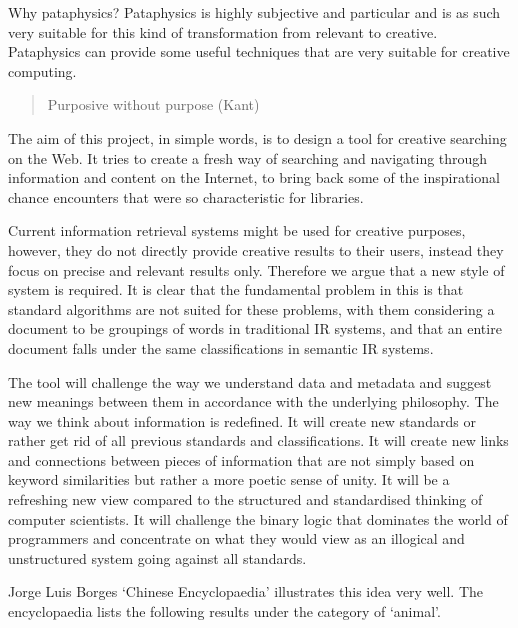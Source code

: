 Why pataphysics?
Pataphysics is highly subjective and particular and is as such very suitable for this kind of transformation from relevant to creative.
Pataphysics can provide some useful techniques that are very suitable for creative computing.

\begin{quote}
  Purposive without purpose (Kant)
\end{quote}

The aim of this project, in simple words, is to design a tool for creative searching on the Web. It tries to create a fresh way of searching and navigating through information and content on the Internet, to bring back some of the inspirational chance encounters that were so characteristic for libraries.

Current information retrieval systems might be used for creative purposes, however, they do not directly provide creative results to their users, instead they focus on precise and relevant results only. Therefore we argue that a new style of system is required. It is clear that the fundamental problem in this is that standard algorithms are not suited for these problems, with them considering a document to be groupings of words in traditional IR systems, and that an entire document falls under the same classifications in semantic IR systems.

The tool will challenge the way we understand data and metadata and suggest new meanings between them in accordance with the underlying philosophy. The way we think about information is redefined. It will create new standards or rather get rid of all previous standards and classifications. It will create new links and connections between pieces of information that are not simply based on keyword similarities but rather a more poetic sense of unity. It will be a refreshing new view compared to the structured and standardised thinking of computer scientists. It will challenge the binary logic that dominates the world of programmers and concentrate on what they would view as an illogical and unstructured system going against all standards.

Jorge Luis Borges `Chinese Encyclopaedia' \autocite{Borges2000} illustrates this idea very well. The encyclopaedia lists the following results under the category of `animal'.

